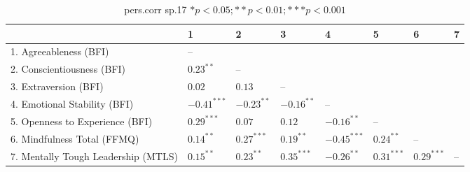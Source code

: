 \begin{table}[ht]
\centering
\begin{tabular}{llllllll}
  \hline
 & 1 & 2 & 3 & 4 & 5 & 6 & 7 \\ 
  \hline
1. Agreeableness (BFI) & -- &  &  &  &  &  &  \\ 
  2. Conscientiousness (BFI) & $0.23^{**}$ & -- &  &  &  &  &  \\ 
  3. Extraversion (BFI) & $0.02$ & $0.13$ & -- &  &  &  &  \\ 
  4. Emotional Stability (BFI) & $-0.41^{***}$ & $-0.23^{**}$ & $-0.16^{**}$ & -- &  &  &  \\ 
  5. Openness to Experience (BFI) & $0.29^{***}$ & $0.07$ & $0.12$ & $-0.16^{**}$ & -- &  &  \\ 
  6. Mindfulness Total (FFMQ) & $0.14^{**}$ & $0.27^{***}$ & $0.19^{**}$ & $-0.45^{***}$ & $0.24^{**}$ & -- &  \\ 
  7. Mentally Tough Leadership (MTLS) & $0.15^{**}$ & $0.23^{**}$ & $0.35^{***}$ & $-0.26^{**}$ & $0.31^{***}$ & $0.29^{***}$ & -- \\ 
   \hline
\end{tabular}
\caption{pers.corr sp.17 $* p < 0.05; ** p < 0.01; *** p < 0.001$} 
\label{freq_corr.pers.corr.sp.17}
\end{table}
